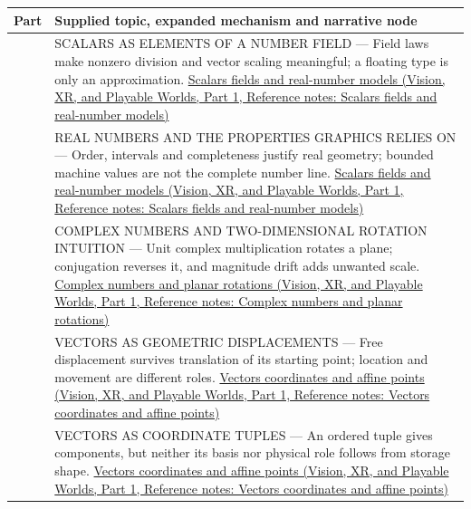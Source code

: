 {\def\LTcaptype{none} %
\begin{longtable}[]{@{}
  >{\raggedright\arraybackslash}p{}
  >{\raggedright\arraybackslash}p{}@{}}
\toprule\noalign{}
\begin{minipage}[b]{\linewidth}\raggedright
Part
\end{minipage} & \begin{minipage}[b]{\linewidth}\raggedright
Supplied topic, expanded mechanism and narrative node
\end{minipage} \\
\midrule\noalign{}
\endhead
\bottomrule\noalign{}
\endlastfoot
501 & SCALARS AS ELEMENTS OF A NUMBER FIELD --- Field laws make nonzero division and vector scaling meaningful; a floating type is only an approximation. \href{../07-Vision-XR-and-Playable-Worlds-P01/main.pdf\#appendix-52051ad550fe}{Scalars fields and real-number models (Vision, XR, and Playable Worlds, Part 1, Reference notes: Scalars fields and real-number models)} \\
502 & REAL NUMBERS AND THE PROPERTIES GRAPHICS RELIES ON --- Order, intervals and completeness justify real geometry; bounded machine values are not the complete number line. \href{../07-Vision-XR-and-Playable-Worlds-P01/main.pdf\#appendix-52051ad550fe}{Scalars fields and real-number models (Vision, XR, and Playable Worlds, Part 1, Reference notes: Scalars fields and real-number models)} \\
503 & COMPLEX NUMBERS AND TWO-DIMENSIONAL ROTATION INTUITION --- Unit complex multiplication rotates a plane; conjugation reverses it, and magnitude drift adds unwanted scale. \href{../07-Vision-XR-and-Playable-Worlds-P01/main.pdf\#appendix-f77eadcc4a93}{Complex numbers and planar rotations (Vision, XR, and Playable Worlds, Part 1, Reference notes: Complex numbers and planar rotations)} \\
504 & VECTORS AS GEOMETRIC DISPLACEMENTS --- Free displacement survives translation of its starting point; location and movement are different roles. \href{../07-Vision-XR-and-Playable-Worlds-P01/main.pdf\#appendix-0659864c0aa3}{Vectors coordinates and affine points (Vision, XR, and Playable Worlds, Part 1, Reference notes: Vectors coordinates and affine points)} \\
505 & VECTORS AS COORDINATE TUPLES --- An ordered tuple gives components, but neither its basis nor physical role follows from storage shape. \href{../07-Vision-XR-and-Playable-Worlds-P01/main.pdf\#appendix-0659864c0aa3}{Vectors coordinates and affine points (Vision, XR, and Playable Worlds, Part 1, Reference notes: Vectors coordinates and affine points)} \\

\end{longtable}}
